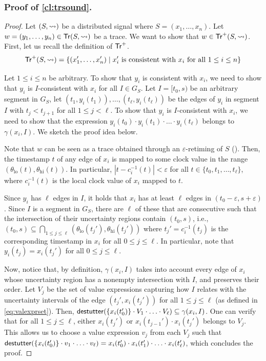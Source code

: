 \subsubsection{Proof of \cref{cl:trsound}.}
\begin{proof}
	Let $(S,{\rightsquigarrow})$ be a distributed signal where $S = (x_1, \ldots, x_n)$.
	Let $w = (y_1, \ldots, y_n) \in \mathsf{Tr}(S,{\rightsquigarrow})$ be a trace.
	We want to show that $w \in \mathsf{Tr}^+(S,{\rightsquigarrow})$.
	First, let us recall the definition of $\mathsf{Tr}^+$.
	\[ \tr^+(S,{\hb}) = \{ (x_1', \ldots, x_n') \st \text{$x_i'$ is consistent with $x_i$ for all $1 \leq i \leq n$}\} \]
	
	Let $1 \leq i \leq n$ be arbitrary.
	To show that $y_i$ is consistent with $x_i$, we need to show that $y_i$ is $I$-consistent with $x_i$ for all $I \in G_S$.
	Let $I = [t_0, s)$ be an arbitrary segment in $G_S$, let $(t_1, y_i(t_1)), \ldots, (t_\ell, y_i(t_\ell))$ be the edges of $y_i$ in segment $I$ with $t_j < t_{j+1}$ for all $1 \leq j < \ell$.
	To show that $y_i$ is $I$-consistent with $x_i$, we need to show that the expression $y_i(t_0) \cdot y_i(t_1) \cdot \ldots \cdot y_i(t_\ell)$ belongs to $\gamma(x_i,I)$.
	We sketch the proof idea below.
	
	Note that $w$ can be seen as a trace obtained through an $\varepsilon$-retiming of $S$ (\cite[Section 4.2]{MomtazAB23}).
	Then, the timestamp $t$ of any edge of $x_i$ is mapped to some clock value in the range $(\theta_{\text{lo}}(t), \theta_{\text{hi}}(t))$.
	In particular, $|t - c^{-1}_i(t)| < \varepsilon$ for all $t \in \{t_0, t_1, \ldots, t_\ell\}$, where $c^{-1}_i(t)$ is the local clock value of $x_i$ mapped to $t$.
	
	Since $y_i$ has $\ell$ edges in $I$, it holds that $x_i$ has at least $\ell$ edges in $(t_0 - \varepsilon, s + \varepsilon)$.
	Since $I$ is a segment in $G_S$, there are $\ell$ of these that are consecutive such that the intersection of their uncertainty regions contain $(t_0,s)$, i.e., $(t_0,s) \subseteq \bigcap_{1 \leq j \leq \ell} (\theta_{\text{lo}}(t_j'), \theta_{\text{hi}}(t_j'))$ where $t_j' = c^{-1}_i(t_j)$ is the corresponding timestamp in $x_i$ for all $0 \leq j \leq \ell$.
	In particular, note that $y_i(t_j) = x_i(t_j')$ for all $0 \leq j \leq \ell$.
		
	Now, notice that, by definition, $\gamma(x_i, I)$ takes into account every edge of $x_i$ whose uncertainty region has a nonempty intersection with $I$, and preserves their order.
	Let $V_j$ be the set of value expressions capturing how $I$ relates with the uncertainty intervals of the edge $(t_j', x_i(t_j'))$ for all $1 \leq j \leq \ell$ (as defined in \cref{eq:valexprset}).
	Then, $\mathsf{destutter}(\{x_i(t_0')\} \cdot V_1 \cdot \ldots \cdot V_\ell) \subseteq \gamma(x_i, I)$.
	One can verify that for all $1 \leq j \leq \ell$, either $x_i(t_j')$ or $x_i(t_{j-1}') \cdot x_i(t_j')$ belongs to $V_j$.
	This allows us to choose a value expression $v_j$ from each $V_j$ such that $\mathsf{destutter}(\{x_i(t_0')\} \cdot v_1 \cdot \ldots \cdot v_\ell) = x_i(t_0') \cdot x_i(t_1') \cdot \ldots \cdot x_i(t_\ell')$, which concludes the proof. 


\end{proof}

